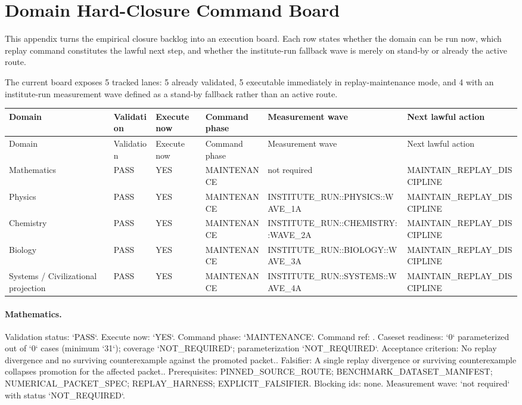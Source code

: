 \section{Domain Hard-Closure Command Board}
\label{sec:oc-core-1-3-domain-execution-board}

This appendix turns the empirical closure backlog into an execution board. Each row states whether the domain can be run now, which replay command constitutes the lawful next step, and whether the institute-run fallback wave is merely on stand-by or already the active route.

The current board exposes 5 tracked lanes: 5 already validated, 5 executable immediately in replay-maintenance mode, and 4 with an institute-run measurement wave defined as a stand-by fallback rather than an active route.

\begin{longtable}{p{}p{}p{}p{}p{}p{}}
\toprule
Domain & Validation & Execute now & Command phase & Measurement wave & Next lawful action \\
\midrule
\endfirsthead
\toprule
Domain & Validation & Execute now & Command phase & Measurement wave & Next lawful action \\
\midrule
\endhead
Mathematics & PASS & YES & MAINTENANCE & not required & MAINTAIN\_REPLAY\_DISCIPLINE \\
Physics & PASS & YES & MAINTENANCE & INSTITUTE\_RUN::PHYSICS::WAVE\_1A & MAINTAIN\_REPLAY\_DISCIPLINE \\
Chemistry & PASS & YES & MAINTENANCE & INSTITUTE\_RUN::CHEMISTRY::WAVE\_2A & MAINTAIN\_REPLAY\_DISCIPLINE \\
Biology & PASS & YES & MAINTENANCE & INSTITUTE\_RUN::BIOLOGY::WAVE\_3A & MAINTAIN\_REPLAY\_DISCIPLINE \\
Systems / Civilizational projection & PASS & YES & MAINTENANCE & INSTITUTE\_RUN::SYSTEMS::WAVE\_4A & MAINTAIN\_REPLAY\_DISCIPLINE \\
\bottomrule
\end{longtable}

\paragraph{Mathematics.}
Validation status: `PASS`. Execute now: `YES`. Command phase: `MAINTENANCE`.
Command ref: .
Caseset readiness: `0` parameterized out of `0` cases (minimum `31`); coverage `NOT\_REQUIRED`; parameterization `NOT\_REQUIRED`.
Acceptance criterion: No replay divergence and no surviving counterexample against the promoted packet..
Falsifier: A single replay divergence or surviving counterexample collapses promotion for the affected packet..
Prerequisites: PINNED\_SOURCE\_ROUTE; BENCHMARK\_DATASET\_MANIFEST; NUMERICAL\_PACKET\_SPEC; REPLAY\_HARNESS; EXPLICIT\_FALSIFIER.
Blocking ids: none.
Measurement wave: `not required` with status `NOT\_REQUIRED`.

